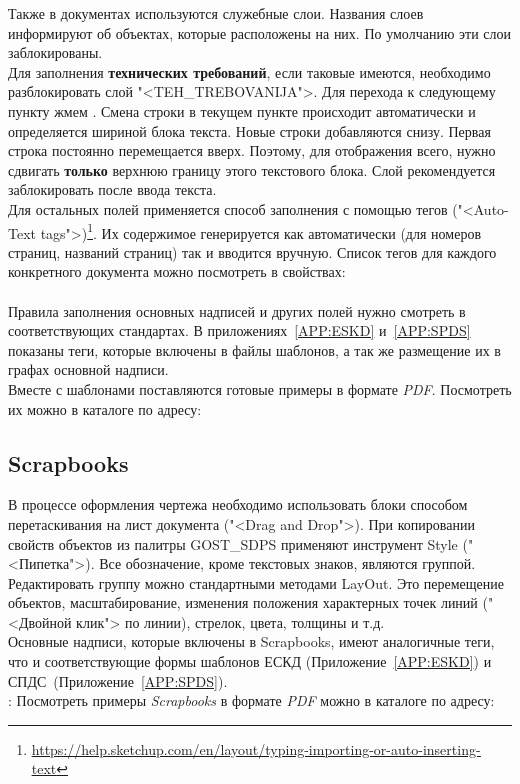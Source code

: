 \documentclass[14pt]{extreport}
\begin{document}
Также в документах используются служебные слои. Названия слоев информируют об объектах, которые расположены на них. По умолчанию эти слои заблокированы.\\
Для заполнения \textbf{технических требований}, если таковые имеются, необходимо разблокировать слой "<\textsf{TEH\_TREBOVANIJA}">. Для перехода к следующему пункту жмем \keys{\enter}. Смена строки в текущем пункте происходит автоматически и определяется шириной блока текста.
Новые строки добавляются снизу. Первая  строка постоянно перемещается вверх.  Поэтому, для отображения всего, нужно сдвигать \textbf{только} верхнюю границу этого текстового блока. Слой рекомендуется заблокировать после ввода текста.\\

Для остальных полей применяется способ заполнения с помощью тегов ("<Auto-Text tags">)\footnote{\href{https://help.sketchup.com/en/layout/typing-importing-or-auto-inserting-text}{\uline{https://help.sketchup.com/en/layout/typing-importing-or-auto-inserting-text}}}. Их содержимое генерируется как автоматически (для номеров страниц, названий страниц) так и вводится вручную. Список тегов для каждого конкретного документа можно посмотреть в свойствах:\\

\noindent
{}\\

Правила заполнения основных надписей и других полей нужно смотреть в соответствующих стандартах. В приложениях~\ref{APP:ESKD} и~\ref{APP:SPDS} показаны теги, которые включены в файлы шаблонов, а так же размещение их в графах основной надписи.\\

Вместе с шаблонами поставляются готовые примеры в формате \emph{PDF}. Посмотреть их можно в каталоге по адресу:\\

\noindent
{\small {}}

\subsection{Scrapbooks}
В процессе оформления чертежа необходимо использовать блоки способом перетаскивания на лист документа ("<Drag and Drop">). При копировании свойств объектов из палитры \textsf{GOST\_SDPS} применяют инструмент \textsf{Style} ("<Пипетка">).
Все обозначение, кроме текстовых знаков, являются группой. Редактировать группу можно стандартными методами LayOut. Это перемещение объектов, масштабирование, изменения положения характерных точек линий ("<Двойной клик"> по линии), стрелок, цвета, толщины и т.д.\\
Основные надписи, которые включены в Scrapbooks, имеют аналогичные теги, что и соответствующие формы шаблонов ЕСКД (Приложение~\ref{APP:ESKD}) и СПДС~(Приложение~\ref{APP:SPDS}).\\
:
Посмотреть примеры \textit{Scrapbooks} в формате \emph{PDF} можно в каталоге по адресу:\\
\end{document}
